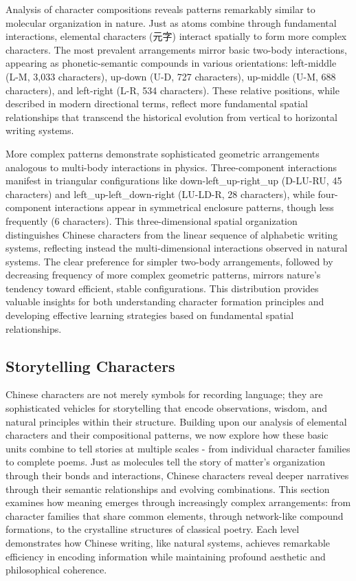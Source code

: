 \documentclass[
  11pt,
  letterpaper,
]{article}
\begin{document}
Analysis of character compositions reveals patterns remarkably similar
to molecular organization in nature. Just as atoms combine through
fundamental interactions, elemental characters (元字) interact spatially
to form more complex characters. The most prevalent arrangements mirror
basic two-body interactions, appearing as phonetic-semantic compounds in
various orientations: left-middle (L-M, 3,033 characters), up-down (U-D,
727 characters), up-middle (U-M, 688 characters), and left-right (L-R,
534 characters). These relative positions, while described in modern
directional terms, reflect more fundamental spatial relationships that
transcend the historical evolution from vertical to horizontal writing
systems.

More complex patterns demonstrate sophisticated geometric arrangements
analogous to multi-body interactions in physics. Three-component
interactions manifest in triangular configurations like
down-left\_up-right\_up (D-LU-RU, 45 characters) and
left\_up-left\_down-right (LU-LD-R, 28 characters), while four-component
interactions appear in symmetrical enclosure patterns, though less
frequently (6 characters). This three-dimensional spatial organization
distinguishes Chinese characters from the linear sequence of alphabetic
writing systems, reflecting instead the multi-dimensional interactions
observed in natural systems. The clear preference for simpler two-body
arrangements, followed by decreasing frequency of more complex geometric
patterns, mirrors nature's tendency toward efficient, stable
configurations. This distribution provides valuable insights for both
understanding character formation principles and developing effective
learning strategies based on fundamental spatial relationships.

\subsection{Storytelling Characters}\label{storytelling-characters}

Chinese characters are not merely symbols for recording language; they
are sophisticated vehicles for storytelling that encode observations,
wisdom, and natural principles within their structure. Building upon our
analysis of elemental characters and their compositional patterns, we
now explore how these basic units combine to tell stories at multiple
scales - from individual character families to complete poems. Just as
molecules tell the story of matter's organization through their bonds
and interactions, Chinese characters reveal deeper narratives through
their semantic relationships and evolving combinations. This section
examines how meaning emerges through increasingly complex arrangements:
from character families that share common elements, through network-like
compound formations, to the crystalline structures of classical poetry.
Each level demonstrates how Chinese writing, like natural systems,
achieves remarkable efficiency in encoding information while maintaining
profound aesthetic and philosophical coherence.
\end{document}
